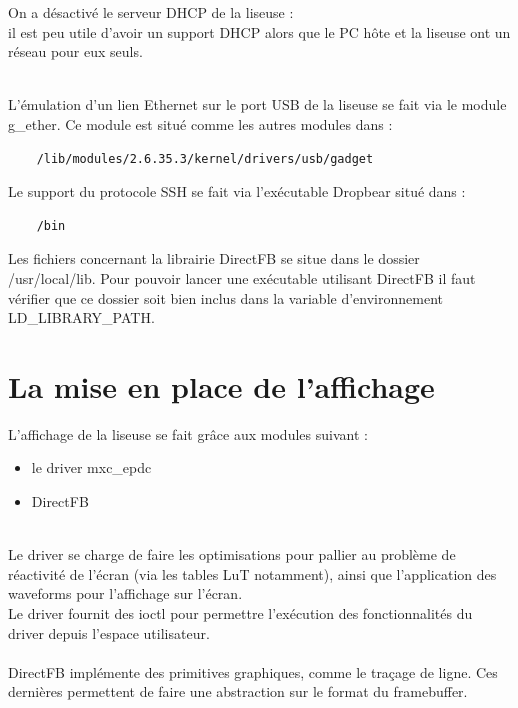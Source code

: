 On a désactivé le serveur DHCP de la liseuse : \\
		il est peu utile d'avoir un support DHCP alors que le PC hôte et la liseuse 
		ont un réseau pour eux seuls.

~\\

L'émulation d'un lien Ethernet sur le port USB de la liseuse se fait via le module g_ether.
Ce module est situé comme les autres modules dans :
	\begin{lstlisting}
	/lib/modules/2.6.35.3/kernel/drivers/usb/gadget
	\end{lstlisting}

Le support du protocole SSH se fait via l'exécutable Dropbear situé dans : 
	\begin{lstlisting}
	/bin
	\end{lstlisting}

Les fichiers concernant la librairie DirectFB se situe dans le dossier /usr/local/lib.
Pour pouvoir lancer une exécutable utilisant DirectFB il faut vérifier que ce dossier soit bien inclus dans la variable d'environnement LD_LIBRARY_PATH.
\section{La mise en place de l'affichage}

L'affichage de la liseuse se fait grâce aux modules suivant : 
\begin{itemize}
	\item le driver mxc_epdc
	\item DirectFB
\end{itemize}~\\

Le driver se charge de faire les optimisations pour pallier au problème de réactivité de l'écran (via les tables LuT notamment), ainsi que l'application des waveforms pour l'affichage sur l'écran.\\
Le driver fournit des ioctl pour permettre l'exécution des fonctionnalités du driver depuis l'espace utilisateur.~\\~\\
DirectFB implémente des primitives graphiques, comme le traçage de ligne. Ces dernières permettent de faire une abstraction sur le format du framebuffer.

